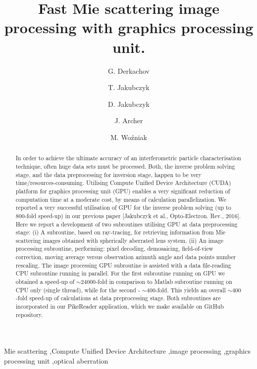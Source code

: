 \documentclass[12pt,dvips]{elsarticle}
\begin{document}
\begin{frontmatter}
\title{Fast Mie scattering image processing with graphics processing unit.}
\author[ifpan]{G. Derkachov}
\author[iccm]{T. Jakubczyk}
\author[ifpan]{D. Jakubczyk}
\author[ifpan]{J. Archer}
\author[ifpan]{M. {Wo\'{z}niak}}

\address[ifpan]{Institute of Physics, Polish Academy of Sciences,
al.~{Lotnik\'{o}w} 32/46, 02-668 Warsaw, Poland}
\address[iccm]{Institute of Control and Computation Engineering, Warsaw University of Technology,
ul.~Nowowiejska 15/19, 00-665 Warsaw, Poland} 

\begin{abstract}
In order to achieve the ultimate accuracy of an interferometric particle characterisation technique, often huge data sets
must be processed. Both, the inverse problem solving stage, and the data preprocessing for inversion stage, happen to be
very time/resources-consuming. Utilising Compute Unified Device Architecture (CUDA) platform for graphics processing unit
(GPU) enables a very significant reduction of computation time at a moderate cost, by means of calculation
parallelization. We reported a very successful utilisation of GPU for the inverse problem solving (up to 800-fold
speed-up) in our previous paper [Jakubczyk et al., Opto-Electron. Rev., 2016]. Here we report a development of two
subroutines utilising GPU at data preprocessing stage: (i) A subroutine, based on ray-tracing, for retrieving information
from Mie scattering images obtained with spherically aberrated lens system. (ii) An image processing subroutine,
performing: pixel decoding, demosaicing, field-of-view correction, moving average versus observation azimuth angle and
data points number rescaling. The image processing GPU subroutine is assisted with a data file-reading CPU subroutine
running in parallel. For the first subroutine running on GPU we obtained a speed-up of $\sim 24000$-fold in comparison to
Matlab subroutine running on CPU only (single thread), while for the second - $\sim 400$-fold. This yields an overall
$\sim 400$-fold speed-up of calculations at data preprocessing stage. Both subroutines are incorporated in our PikeReader
application, which we make available on GitHub repository.
\end{abstract}

\begin{keyword}
Mie scattering \sep Compute Unified Device Architecture \sep image processing \sep graphics processing unit \sep optical
aberration
\end{keyword}
\end{frontmatter}
\end{document}
